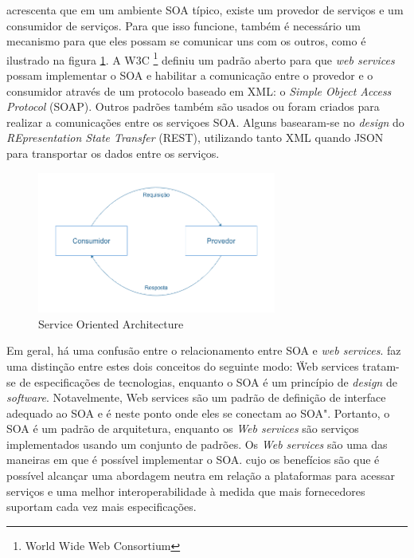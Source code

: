  acrescenta que em um ambiente SOA típico, existe um provedor de serviços e um consumidor de serviços. Para que isso funcione, também é necessário um mecanismo para que eles possam se comunicar uns com os outros, como é ilustrado na figura \ref{fig:soa}. A W3C \footnote{World Wide Web Consortium} definiu um padrão aberto para que \textit{web services} possam implementar o SOA e habilitar a comunicação entre o provedor e o consumidor através de um protocolo baseado em XML: o \textit{Simple Object Access Protocol} (SOAP). Outros padrões também são usados ou foram criados para realizar a comunicações entre os serviçoes SOA. Alguns basearam-se no \textit{design} do \textit{REpresentation State Transfer} (REST), utilizando tanto XML quando JSON para transportar os dados entre os serviços.

\begin{figure}[htbp]
    \centering
    \includegraphics[width=0.7\textwidth]{figuras/soa.png}
    \caption{Service Oriented Architecture}
    \label{fig:soa}
\end{figure}

Em geral, há uma confusão entre o relacionamento entre SOA e \textit{web services}.  faz uma distinção entre estes dois conceitos do seguinte modo: \"Web services tratam-se de especificações de tecnologias, enquanto o SOA é um princípio de \textit{design} de \textit{software}. Notavelmente, Web services são um padrão de definição de interface adequado ao SOA e é neste ponto onde eles se conectam ao SOA". Portanto, o SOA é um padrão de arquitetura, enquanto os \textit{Web services} são serviços implementados usando um conjunto de padrões. Os \textit{Web services} são uma das maneiras em que é possível implementar o SOA. cujo os benefícios são que é possível alcançar uma abordagem neutra em relação a plataformas para acessar serviços e uma melhor interoperabilidade à medida que mais fornecedores suportam cada vez mais especificações.

